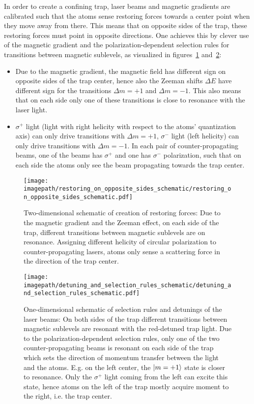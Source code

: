In order to create a confining trap, laser beams and magnetic gradients are calibrated such that the atoms sense restoring forces towards a center point when they move away from there. This means that on opposite sides of the trap, these restoring forces must point in opposite directions. One achieves this by clever use of the magnetic gradient and the polarization-dependent selection rules for transitions between magnetic sublevels, as visualized in figures~\ref{fig:restoring_on_opposite_sides_schematic} and~\ref{fig:detuning_and_selection_rules_schematic}:
\begin{itemize}
    \item Due to the magnetic gradient, the magnetic field has different sign on opposite sides of the trap center, hence also the Zeeman shifts $\Delta E$ have different sign for the transitions $\Delta m = +1$ and $\Delta m = -1$. This also means that on each side only one of these transitions is close to resonance with the laser light.
    \item $\sigma^+$ light (light with right helicity with respect to the atoms' quantization axis) can only drive transitions with $\Delta m = +1$, $\sigma^-$ light (left helicity) can only drive transitions with $\Delta m = -1$. In each pair of counter-propagating beams, one of the beams has $\sigma^+$ and one has $\sigma^-$ polarization, such that on each side the atoms only see the beam propagating towards the trap center.
\end{itemize}

\begin{figure}
    \centering
    \texttt{[image: \\imagepath/restoring\_on\_opposite\_sides\_schematic/restoring\_on\_opposite\_sides\_schematic.pdf]}
    \caption{Two-dimensional schematic of creation of restoring forces: Due to the magnetic gradient and the Zeeman effect, on each side of the trap, different transitions between magnetic sublevels are on resonance. Assigning different helicity of circular polarization to counter-propagating lasers, atoms only sense a scattering force in the direction of the trap center.}\label{fig:restoring_on_opposite_sides_schematic}
\end{figure} 

\begin{figure}
    \centering
    \texttt{[image: \\imagepath/detuning\_and\_selection\_rules\_schematic/detuning\_and\_selection\_rules\_schematic.pdf]}
    \caption{One-dimensional schematic of selection rules and detunings of the laser beams: On both sides of the trap different transitions between magnetic sublevels are resonant with the red-detuned trap light. Due to the polarization-dependent selection rules, only one of the two counter-propagating beams is resonant on each side of the trap which sets the direction of momentum transfer between the light and the atoms. E.g. on the left center, the $\Ket{m = +1}$ state is closer to resonance. Only the $\sigma^+$ light coming from the left can excite this state, hence atoms on the left of the trap mostly acquire moment to the right, i.e. the trap center.}
    \label{fig:detuning_and_selection_rules_schematic}
\end{figure}

